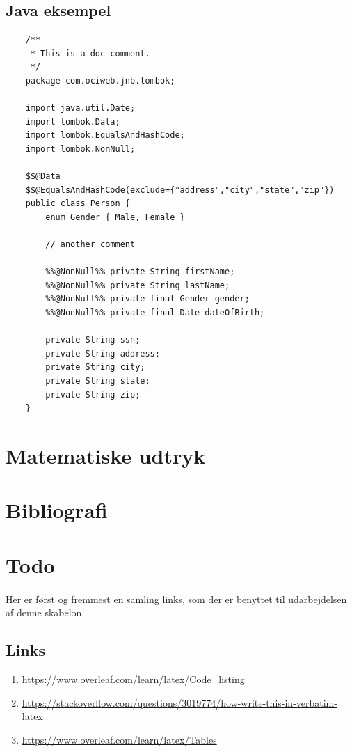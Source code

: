 \documentclass{article}
\begin{document}
\subsection{Java eksempel}
\begin{lstlisting}
    /**
     * This is a doc comment.
     */
    package com.ociweb.jnb.lombok;
    
    import java.util.Date;
    import lombok.Data;
    import lombok.EqualsAndHashCode;
    import lombok.NonNull;
    
    $$@Data
    $$@EqualsAndHashCode(exclude={"address","city","state","zip"})
    public class Person {
        enum Gender { Male, Female }
    
        // another comment
    
        %%@NonNull%% private String firstName;
        %%@NonNull%% private String lastName;
        %%@NonNull%% private final Gender gender;
        %%@NonNull%% private final Date dateOfBirth;
    
        private String ssn;
        private String address;
        private String city;
        private String state;
        private String zip;
    }
    \end{lstlisting}
\section{Matematiske udtryk}
\section{Bibliografi}
\section{Todo}
\paragraph{}
Her er først og fremmest en samling links, som der er benyttet til udarbejdelsen af denne skabelon.
\subsection{Links}
    \begin{enumerate}
        \item \url{https://www.overleaf.com/learn/latex/Code_listing}
        \item \url{https://stackoverflow.com/questions/3019774/how-write-this-in-verbatim-latex}
        \item \url{https://www.overleaf.com/learn/latex/Tables}
    \end{enumerate}
\end{document}
